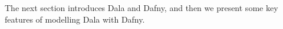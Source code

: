 The next section introduces Dala and Dafny, and then we present some key features of modelling Dala with Dafny. 









